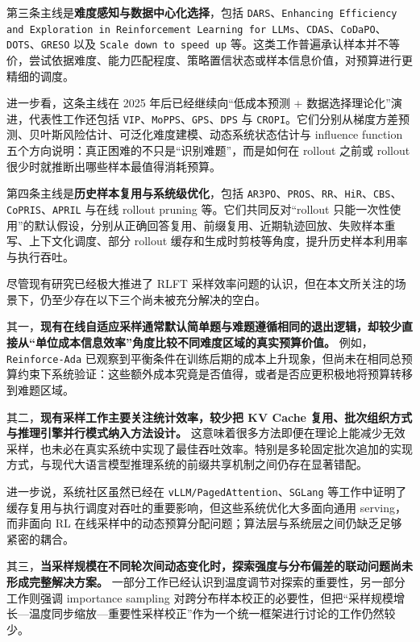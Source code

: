 {第三条主线是\textbf{难度感知与数据中心化选择}，包括 \texttt{DARS}、\texttt{Enhancing Efficiency and Exploration in Reinforcement Learning for LLMs}、\texttt{CDAS}、\texttt{CoDaPO}、\texttt{DOTS}、\texttt{GRESO} 以及 \texttt{Scale down to speed up} 等。这类工作普遍承认样本并不等价，尝试依据难度、能力匹配程度、策略置信状态或样本信息价值，对预算进行更精细的调度。

进一步看，这条主线在 2025 年后已经继续向“低成本预测 + 数据选择理论化”演进，代表性工作还包括 \texttt{VIP}、\texttt{MoPPS}、\texttt{GPS}、\texttt{DPS} 与 \texttt{CROPI}。它们分别从梯度方差预测、贝叶斯风险估计、可泛化难度建模、动态系统状态估计与 influence function 五个方向说明：真正困难的不只是“识别难题”，而是如何在 rollout 之前或 rollout 很少时就推断出哪些样本最值得消耗预算。

第四条主线是\textbf{历史样本复用与系统级优化}，包括 \texttt{AR3PO}、\texttt{PROS}、\texttt{RR}、\texttt{HiR}、\texttt{CBS}、\texttt{CoPRIS}、\texttt{APRIL} 与在线 rollout pruning 等。它们共同反对“rollout 只能一次性使用”的默认假设，分别从正确回答复用、前缀复用、近期轨迹回放、失败样本重写、上下文化调度、部分 rollout 缓存和生成时剪枝等角度，提升历史样本利用率与执行吞吐。

尽管现有研究已经极大推进了 RLFT 采样效率问题的认识，但在本文所关注的场景下，仍至少存在以下三个尚未被充分解决的空白。

其一，\textbf{现有在线自适应采样通常默认简单题与难题遵循相同的退出逻辑，却较少直接从“单位成本信息效率”角度比较不同难度区域的真实预算价值。} 例如，\texttt{Reinforce-Ada} 已观察到平衡条件在训练后期的成本上升现象，但尚未在相同总预算约束下系统验证：这些额外成本究竟是否值得，或者是否应更积极地将预算转移到难题区域。

其二，\textbf{现有采样工作主要关注统计效率，较少把 KV Cache 复用、批次组织方式与推理引擎并行模式纳入方法设计。} 这意味着很多方法即便在理论上能减少无效采样，也未必在真实系统中实现了最佳吞吐效率。特别是多轮固定批次追加的实现方式，与现代大语言模型推理系统的前缀共享机制之间仍存在显著错配。

进一步说，系统社区虽然已经在 \texttt{vLLM/PagedAttention}、\texttt{SGLang} 等工作中证明了缓存复用与执行调度对吞吐的重要影响，但这些系统优化大多面向通用 serving，而非面向 RL 在线采样中的动态预算分配问题；算法层与系统层之间仍缺乏足够紧密的耦合。

其三，\textbf{当采样规模在不同轮次间动态变化时，探索强度与分布偏差的联动问题尚未形成完整解决方案。} 一部分工作已经认识到温度调节对探索的重要性，另一部分工作则强调 importance sampling 对跨分布样本校正的必要性，但把“采样规模增长—温度同步缩放—重要性采样校正”作为一个统一框架进行讨论的工作仍然较少。

}
